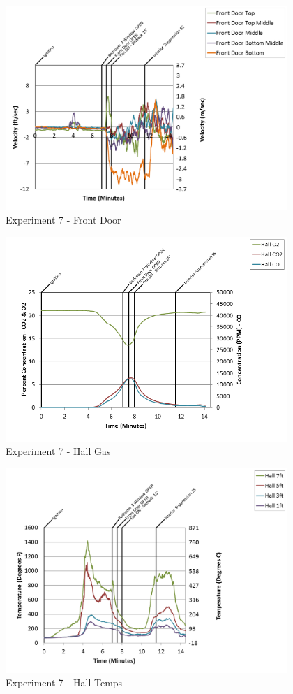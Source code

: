 \documentclass{article}
\begin{document}
\begin{appendices}
\begin{figure}[h!]
	\centering
	\includegraphics[height=3.05in]{0_Images/Results_Charts/Exp_7_Charts/FrontDoor.png}
	\caption{Experiment 7 - Front Door}
\end{figure}

\clearpage

\begin{figure}[h!]
	\centering
	\includegraphics[height=3.05in]{0_Images/Results_Charts/Exp_7_Charts/HallGas.png}
	\caption{Experiment 7 - Hall Gas}
\end{figure}


\begin{figure}[h!]
	\centering
	\includegraphics[height=3.05in]{0_Images/Results_Charts/Exp_7_Charts/HallTemps.png}
	\caption{Experiment 7 - Hall Temps}
\end{figure}


\end{appendices}
\end{document}
